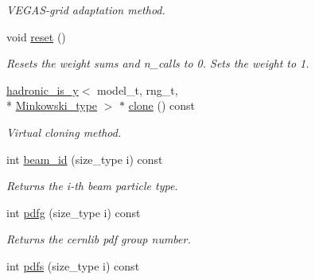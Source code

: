 \begin{DoxyCompactItemize}
\begin{DoxyCompactList}\small\item\em V\-E\-G\-A\-S-\/grid adaptation method. \end{DoxyCompactList}\item 
\hypertarget{a00259_a0b504d75eb09425456b2d27af5f2c71b}{void \hyperlink{a00259_a0b504d75eb09425456b2d27af5f2c71b}{reset} ()}\label{a00259_a0b504d75eb09425456b2d27af5f2c71b}

\begin{DoxyCompactList}\small\item\em Resets the weight sums and n\-\_\-calls to 0. Sets the weight to 1. \end{DoxyCompactList}\item 
\hypertarget{a00259_a2aa3b526cc526742df0ac5159788e1a1}{\hyperlink{a00258}{hadronic\-\_\-is\-\_\-y}$<$ model\-\_\-t, rng\-\_\-t, \\*
\hyperlink{a00369}{Minkowski\-\_\-type} $>$ $\ast$ \hyperlink{a00259_a2aa3b526cc526742df0ac5159788e1a1}{clone} () const }\label{a00259_a2aa3b526cc526742df0ac5159788e1a1}

\begin{DoxyCompactList}\small\item\em Virtual cloning method. \end{DoxyCompactList}\item 
\hypertarget{a00259_a77ab576fbb1779f2247caa69597b5b94}{int \hyperlink{a00259_a77ab576fbb1779f2247caa69597b5b94}{beam\-\_\-id} (size\-\_\-type i) const }\label{a00259_a77ab576fbb1779f2247caa69597b5b94}

\begin{DoxyCompactList}\small\item\em Returns the i-\/th beam particle type. \end{DoxyCompactList}\item 
\hypertarget{a00259_a4d73ff387bd178cac4b0e41e64c63236}{int \hyperlink{a00259_a4d73ff387bd178cac4b0e41e64c63236}{pdfg} (size\-\_\-type i) const }\label{a00259_a4d73ff387bd178cac4b0e41e64c63236}

\begin{DoxyCompactList}\small\item\em Returns the cernlib pdf group number. \end{DoxyCompactList}\item 
\hypertarget{a00259_a2d4c104dbb41559ee91885ddd929486f}{int \hyperlink{a00259_a2d4c104dbb41559ee91885ddd929486f}{pdfs} (size\-\_\-type i) const }\label{a00259_a2d4c104dbb41559ee91885ddd929486f}


\end{DoxyCompactItemize}
